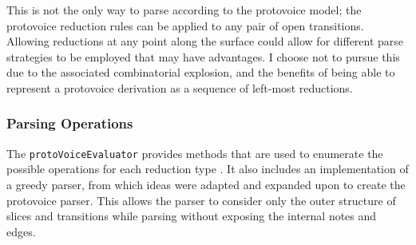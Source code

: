 \documentclass[12pt,a4paper,twoside,openright]{report} \usepackage[pdfborder={0 0 0}]{hyperref}    %
\theoremstyle{definition} \newtheorem{definition}{Definition}[section]
\begin{document}



      This is not the only way to parse according to the protovoice model; the protovoice reduction rules can be applied
      to any pair of open transitions. Allowing reductions at any point along the surface could allow for different
      parse strategies to be employed that may have advantages. I choose not to pursue this due to the associated
      combinatorial explosion, and the benefits of being able to represent a protovoice derivation as a sequence of
      left-most reductions.

      \subsubsection{Parsing Operations} The \texttt{protoVoiceEvaluator}
      \cite{finkensiepModelingInferringProtovoice2021} provides methods that are used to enumerate the possible
      operations for each reduction type \footnotemark. It also includes an implementation of a greedy parser, from
      which ideas were adapted and expanded upon to create the protovoice parser. This allows the parser to consider
      only the outer structure of slices and transitions while parsing without exposing the internal notes and edges.
\end{document}
